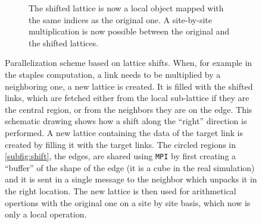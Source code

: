 \begin{figure}[hbt!]
\begin{subfigure}{\textwidth}
        \caption{The shifted lattice is now a local object mapped with the same indices as the original one. A site-by-site multiplication is now possible between the original and the shifted lattices.}
    \end{subfigure}
    \caption{Parallelization scheme based on lattice shifts. When, for example in the staples computation, a link needs to be multiplied by a neighboring one, a new lattice is created. It is filled with the shifted links, which are fetched either from the local sub-lattice if they are the central region, or from the neighbors they are on the edge. This schematic drawing shows how a shift along the ``right'' direction is performed. A new lattice containing the data of the target link is created by filling it with the target links. The circled regions in \cref{subfig:shift}, the edges, are shared using \texttt{MPI} by first creating a ``buffer'' of the shape of the edge (it is a cube in the real simulation) and it is sent in a single message to the neighbor which unpacks it in the right location. The new lattice is then used for arithmetical opertions with the original one on a site by site basis, which now is only a local operation.}
    \label{fig:shift}
\end{figure}